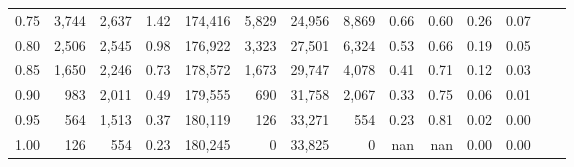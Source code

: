 \begin{tabular}{rrrrrrrrrrrrrr}
0.75 &   3,744 &  2,637 &    1.42 &  174,416 &    5,829 &  24,956 &   8,869 &  0.66 &  0.60 &  0.26 &      0.07 \\
0.80 &   2,506 &  2,545 &    0.98 &  176,922 &    3,323 &  27,501 &   6,324 &  0.53 &  0.66 &  0.19 &      0.05 \\
0.85 &   1,650 &  2,246 &    0.73 &  178,572 &    1,673 &  29,747 &   4,078 &  0.41 &  0.71 &  0.12 &      0.03 \\
0.90 &     983 &  2,011 &    0.49 &  179,555 &      690 &  31,758 &   2,067 &  0.33 &  0.75 &  0.06 &      0.01 \\
0.95 &     564 &  1,513 &    0.37 &  180,119 &      126 &  33,271 &     554 &  0.23 &  0.81 &  0.02 &      0.00 \\
1.00 &     126 &    554 &    0.23 &  180,245 &        0 &  33,825 &       0 &   nan &   nan &  0.00 &      0.00 \\
\bottomrule
\end{tabular}

